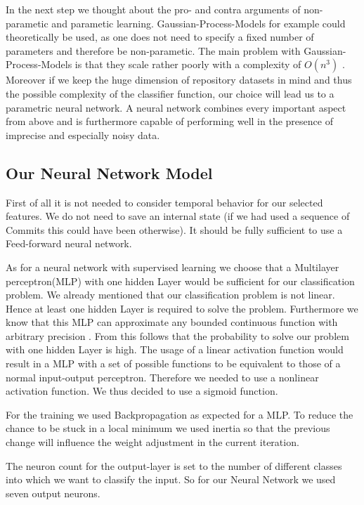 \documentclass[paper=A4,pagesize=auto,12pt,headinclude=true,footinclude=true,BCOR=0mm,DIV=calc]{scrartcl}
\begin{document}
	In the next step we thought about the pro- and contra arguments of non-parametic and parametic learning.
	Gaussian-Process-Models for example could theoretically be used, as one does not need to specify a fixed number of parameters and therefore be non-parametic. 
	The main problem with Gaussian-Process-Models is that they scale rather poorly with a complexity of $O(n^{3})$ \cite{DukeUniversity}. Moreover if we keep the huge dimension of repository datasets in mind and thus the possible complexity of the classifier function, our choice will lead us to a parametric neural network. A neural network combines every important aspect from above and is furthermore capable of performing well in the presence of imprecise and especially noisy data.
	
	\subsection{Our Neural Network Model}
	First of all it is not needed to consider temporal behavior for our selected features. We do not need to save an internal state (if we had used a sequence of Commits this could have been otherwise). It should be fully sufficient to use a Feed-forward neural network.
	
	As for a neural network with supervised learning we choose that a Multilayer perceptron(MLP) with one hidden Layer would be sufficient for our classification problem. We already mentioned that our classification problem is not linear. Hence at least one hidden Layer is required to solve the problem. Furthermore we know that this MLP can approximate any bounded continuous function with arbitrary precision \cite{ApproximateAnyFunction}. From this follows that the probability to solve our problem with one hidden Layer is high.
	The usage of a linear activation function would result in a MLP with a set of possible functions to be equivalent to those of a normal input-output perceptron. Therefore we needed to use a nonlinear activation function. We thus decided to use a sigmoid function. 
	
	For the training we used Backpropagation as expected for a MLP. To reduce the chance to be stuck in a local minimum we used inertia so that the previous change will influence the weight adjustment in the current iteration.
	
	The neuron count for the output-layer is set to the number of different classes into which we want to classify the input. So for our Neural Network we used seven output neurons.
	
\end{document}
